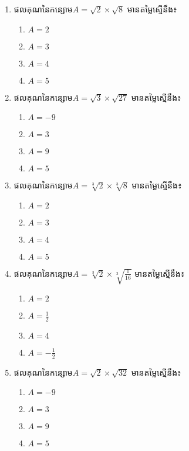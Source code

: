 \begin{enumerate}
\item ផលគុណនៃកន្សោម$A=\sqrt{2}\times \sqrt{8}$  មានតម្លៃស្មើនឹង៖
\begin{multicols}{4}
\begin{enumerate}[label=\alph*.]
	\item $A=2$
	\item $A=3$
	\item $A=4$
	\item $A=5$
\end{enumerate}
\end{multicols}
\item ផលគុណនៃកន្សោម$A=\sqrt{3}\times \sqrt{27}$  មានតម្លៃស្មើនឹង៖
\begin{multicols}{4}
\begin{enumerate}[label=\alph*.]
	\item $A=-9$
	\item $A=3$
	\item $A=9$
	\item $A=5$
\end{enumerate}
\end{multicols}

\item ផលគុណនៃកន្សោម$A=\sqrt[3]{2}\times \sqrt[3]{8}$  មានតម្លៃស្មើនឹង៖
\begin{multicols}{4}
\begin{enumerate}[label=\alph*.]
	\item $A=2$
	\item $A=3$
	\item $A=4$
	\item $A=5$
\end{enumerate}
\end{multicols}
\item ផលគុណនៃកន្សោម$A=\sqrt[3]{2}\times \sqrt[3]{\frac{1}{16}}$  មានតម្លៃស្មើនឹង៖
\begin{multicols}{4}
\begin{enumerate}[label=\alph*.]
	\item $A=2$
	\item $A=\frac{1}{2}$
	\item $A=4$
	\item $A=-\frac{1}{2}$
\end{enumerate}
\end{multicols}

\item ផលគុណនៃកន្សោម$A=\sqrt{2}\times \sqrt{32}$  មានតម្លៃស្មើនឹង៖
\begin{multicols}{4}
\begin{enumerate}[label=\alph*.]
	\item $A=-9$
	\item $A=3$
	\item $A=9$
	\item $A=5$
\end{enumerate}
\end{multicols}


\end{enumerate}

